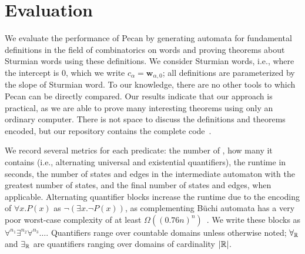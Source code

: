 \section{Evaluation}\label{sec:evaluation}

We evaluate the performance of Pecan by generating automata for fundamental definitions in the field of combinatorics on words and proving theorems about Sturmian words using these definitions.
We consider  Sturmian words, i.e., where the intercept is $0$, which we write $c_{\alpha} = \mathbf{w}_{\alpha,0}$; all definitions are parameterized by the slope of Sturmian word.
To our knowledge, there are no other tools to which Pecan can be directly compared.
Our results indicate that our approach is practical, as we are able to prove many interesting theorems using only an ordinary computer.
There is not space to discuss the definitions and theorems encoded, but our repository contains the complete code~\cite{sturmian-words-repo}.

We record several metrics for each predicate: the number of , how many  it contains (i.e., alternating universal and existential quantifiers), the runtime in seconds, the number of states and edges in the intermediate automaton with the greatest number of states, and the final number of states and edges, when applicable.
Alternating quantifier blocks increase the runtime due to the encoding of $\forall x. P(x)$ as $\lnot(\exists x. \lnot P(x))$, as complementing B\"uchi automata has a very poor worst-case complexity of at least $\Omega((0.76n)^n)$~\cite{Yan2008}.
We write these blocks as $\forall^{n_1}\exists^{n_2}\forall^{n_3}\ldots$.
Quantifiers range over countable domains unless otherwise noted; $\forall_{\mathbb{R}}$ and $\exists_{\mathbb{R}}$ are quantifiers ranging over domains of cardinality $|\mathbb{R}|$. %

